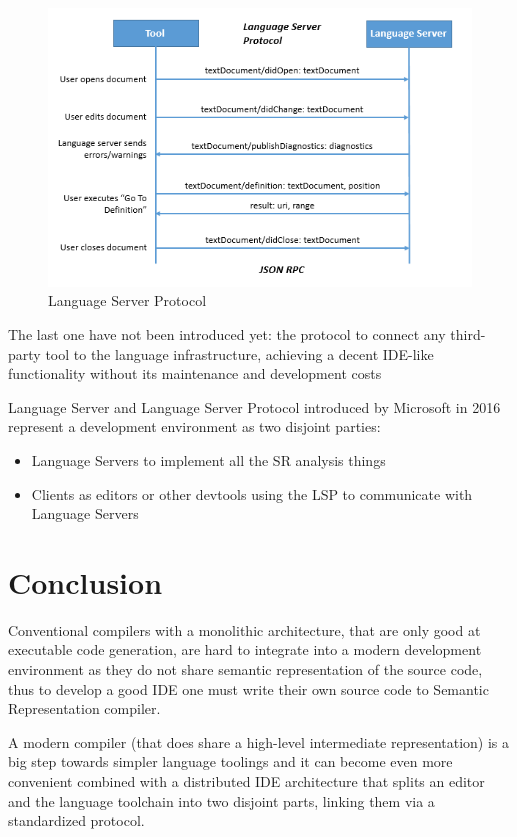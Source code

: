 \begin{figure}[H]
    \centering
    \includegraphics[width=1.0\textwidth]{figs/lsp.png}
    \caption{Language Server Protocol}
\end{figure}

The last one have not been introduced yet: the protocol to connect any
third-party tool to the language infrastructure, achieving a decent IDE-like
functionality without its maintenance and development costs
   
Language Server and Language Server Protocol introduced by Microsoft in 2016
represent a development environment as two disjoint parties:
\begin{itemize}
    \item Language Servers to implement all the SR analysis things
    \item Clients as editors or other devtools using the LSP to communicate with Language Servers \cite{Sourcegraph}
\end{itemize}

\newpage
\section{Conclusion}
\label{sec:review_conclusion}

Conventional compilers with a monolithic architecture, that are only good at executable code generation,
are hard to integrate into a modern development environment as they do not share 
semantic representation of the source code, thus to develop a good IDE one must write their own 
source code to Semantic Representation compiler.

A modern compiler (that does share a high-level intermediate representation) is
a big step towards simpler language toolings and it can become even more convenient
combined with a distributed IDE architecture that splits an editor and the language toolchain
into two disjoint parts, linking them via a standardized protocol.

